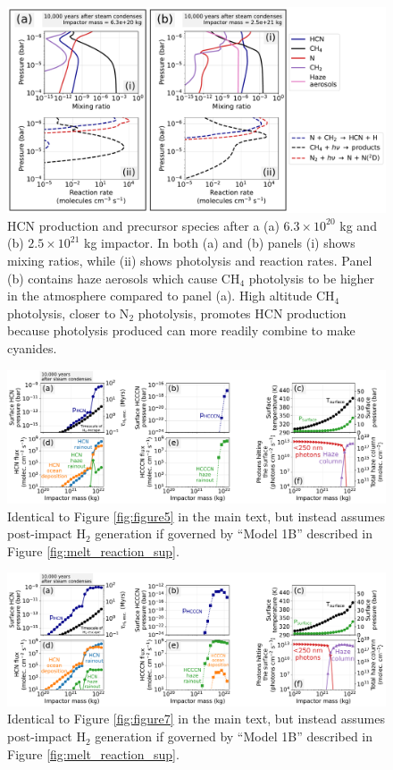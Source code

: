 \begin{figure}
  \centering
  \includegraphics[width=1.0\textwidth]{tex/5impacts/figures/supplement/CH4_N_HCN.pdf}
  \caption{HCN production and precursor species after a (a) $6.3 \times 10^{20}$ kg and (b) $2.5 \times 10^{21}$ kg impactor. In both (a) and (b) panels (i) shows mixing ratios, while (ii) shows photolysis and reaction rates. Panel (b) contains haze aerosols which cause CH$_4$ photolysis to be higher in the atmosphere compared to panel (a). High altitude CH$_4$ photolysis, closer to N$_2$ photolysis, promotes HCN production because photolysis produced can more readily combine to make cyanides.}
  \label{fig:ch4_n_hcn}
\end{figure}

\begin{figure}
  \centering
  \includegraphics[width=1.0\textwidth]{tex/5impacts/figures/supplement/Figure5_Citron.pdf}
  \caption{Identical to Figure \ref{fig:figure5} in the main text, but instead assumes post-impact H$_2$ generation if governed by ``Model 1B'' described in Figure \ref{fig:melt_reaction_sup}.}
  \label{fig:figure5_citron}
\end{figure}

\begin{figure}
  \centering
  \includegraphics[width=1.0\textwidth]{tex/5impacts/figures/supplement/Figure7_Citron.pdf}
  \caption{Identical to Figure \ref{fig:figure7} in the main text, but instead assumes post-impact H$_2$ generation if governed by ``Model 1B'' described in Figure \ref{fig:melt_reaction_sup}.}
  \label{fig:figure7_citron}
\end{figure}


